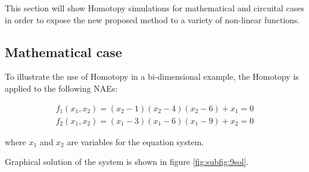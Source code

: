 \documentclass[journal,twocolumn]{IEEEtran}
\begin{document}
This section will show Homotopy simulations for mathematical and circuital cases in order to expose the new proposed method to a variety of non-linear functions.

\subsection{Mathematical case}

To illustrate the use of Homotopy in a bi-dimensional example, the Homotopy is applied to the following NAEs:

\begin{displaymath}
\begin{array}{c}
f_1(x_1,x_2)=(x_2-1)(x_2-4)(x_2-6)+x_1=0\\
f_2(x_1,x_2)=(x_1-3)(x_1-6)(x_1-9)+x_2=0
\end{array}
\end{displaymath}

where $x_1$ and $x_2$ are variables for the equation system.

Graphical solution of the system is shown in figure \ref{fig:subfig:9sol}.
\end{document}
